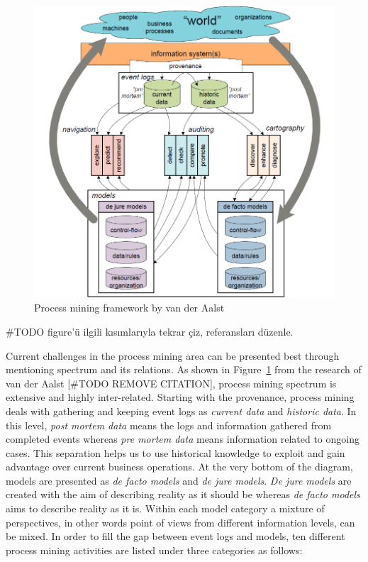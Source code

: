 \begin{figure}
  \centering
  \includegraphics[width=\textwidth]{2_relatedwork/process-mining-spectrum}
  \caption{Process mining framework by van der Aalst}
  \label{fig:process-mining-spectrum}
\end{figure}
#TODO figure'ü ilgili kısımlarıyla tekrar çiz, referansları düzenle.

Current challenges in the process mining area can be presented best through mentioning spectrum and its relations. As shown in Figure~\ref{fig:process-mining-spectrum} from the research of van der Aalst [#TODO REMOVE CITATION], process mining spectrum is extensive and highly inter-related. Starting with the provenance, process mining deals with gathering and keeping event logs as \textit{current data} and \textit{historic data}. In this level, \textit{post mortem data} means the logs and information gathered from completed events whereas \textit{pre mortem data} means information related to ongoing cases. This separation helps us to use historical knowledge to exploit and gain advantage over current business operations. At the very bottom of the diagram, models are presented as \textit{de facto models} and \textit{de jure models}. \textit{De jure models} are created with the aim of describing reality as it should be whereas \textit{de facto models} aims to describe reality as it is. Within each model category a mixture of perspectives, in other words point of views from different information levels, can be mixed. In order to fill the gap between event logs and models, ten different process mining activities are listed under three categories \cite{van2011process} as follows:


